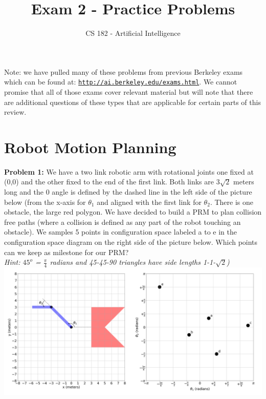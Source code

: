 \documentclass[a4paper]{article}
\title{Exam 2 - Practice Problems}
\author{CS 182 - Artificial Intelligence}
\date{}
\newif\ifsol
\begin{document}
\maketitle

Note: we have pulled many of these problems from previous Berkeley exams which can be found at: \href{http://ai.berkeley.edu/exams.html}{\texttt{http://ai.berkeley.edu/exams.html}}. We cannot promise that all of those exams cover relevant material but will note that there are additional questions of these types that are applicable for certain parts of this review.

\section{Robot Motion Planning}
    \noindent \textbf{Problem 1:} We have a two link robotic arm with rotational joints one fixed at (0,0) and the other fixed to the end of the first link. Both links are $3\sqrt{2}$ meters long and the 0 angle is defined by the dashed line in the left side of the picture below (from the x-axis for $\theta_1$ and aligned with the first link for $\theta_2$. There is one obstacle, the large red polygon. We have decided to build a PRM to plan collision free paths (where a collision is defined as any part of the robot touching an obstacle). We samples 5 points in configuration space labeled a to e in the configuration space diagram on the right side of the picture below. Which points can we keep as milestone for our PRM? \\ \textit{Hint: $45^o$ = $\frac{\pi}{4}$ radians and 45-45-90 triangles have side lengths 1-1-$\sqrt{2}$)}\\
    \includegraphics[width=\textwidth]{figs/multiPoint.png}\\
    \ifsol {\color{blue} We can retain only the collision free samples. We can note that since the ``elbow'' of the robot will be in collision when $-\frac{\pi}{4} < \theta_1 < \frac{\pi}{4}$ we can discard samples a and b. We can also discard sample d as while the first link will just be outside the obstacle the second link will be turned down and hitting the obstacle. Samples c and e have the arm on the left side of the task space and thus safe and can be kept for the PRM.}
    \bigskip
    \else \bigskip \bigskip \bigskip \bigskip \bigskip
    \fi
    
\end{document}
